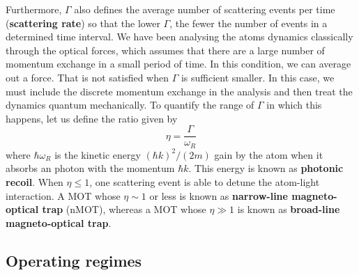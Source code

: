 Furthermore, $ \Gamma $ also defines the average number of scattering events per time (\textbf{scattering rate}) so that the lower $ \Gamma $, the fewer the number of events in a determined time interval. We have been analysing the atoms dynamics classically through the optical forces, which assumes that there are a large number of momentum exchange in a small period of time. In this condition, we can average out a force. That is not satisfied when $ \Gamma $ is sufficient smaller. In this case, we must include the discrete momentum exchange in the analysis and then treat the dynamics quantum mechanically. To quantify the range of $ \Gamma $ in which this happens, let us define the ratio given by
\begin{equation}
    \eta = \frac{\Gamma}{\omega_R}
    \label{eq:eta-ratio}
\end{equation}
where $ \hbar \omega_R $ is the kinetic energy $ (\hbar k)^2 / (2 m) $ gain by the atom when it absorbs an photon with the momentum $ \hbar k $. This energy is known as \textbf{photonic recoil}. When $ \eta \leq 1 $, one scattering event is able to detune the atom-light interaction. A MOT whose $ \eta \sim 1 $ or less is known as \textbf{narrow-line magneto-optical trap} (nMOT), whereas a MOT whose $ \eta \gg 1 $ is known as \textbf{broad-line magneto-optical trap}.


\subsection{Operating regimes}
\label{sec:nMOT-operating-regimes}

